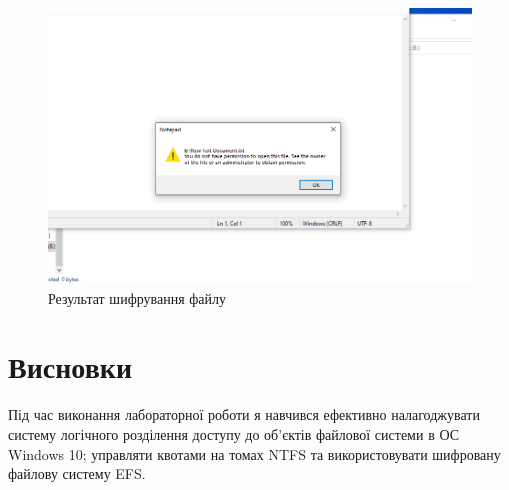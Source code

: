\documentclass[oneside,14pt]{extarticle}
\begin{document}
\begin{normalsize}
	\begin{figure}[H]
		\centering
		\includegraphics[width=\columnwidth]{18}
		\caption{Результат шифрування файлу}
	\end{figure}
	
	\section*{Висновки}
	Під час виконання лабораторної роботи я навчився ефективно налагоджувати систему логічного
	розділення доступу до об’єктів файлової системи в ОС Windows 10; управляти
	квотами на томах NTFS та використовувати шифровану файлову систему EFS.
		    
\end{normalsize}
\end{document}

